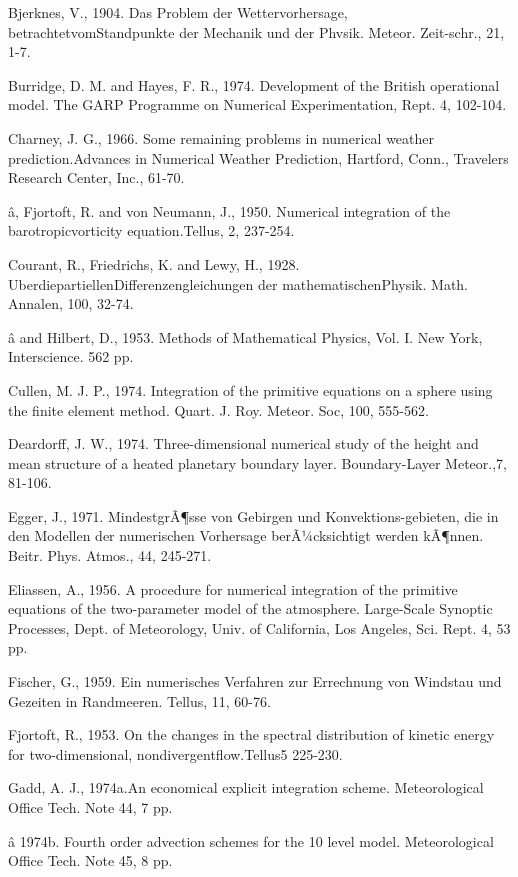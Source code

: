 Bjerknes, V., 1904. Das Problem der Wettervorhersage,
betrachtetvomStandpunkte der Mechanik und der Phvsik. Meteor.
Zeit-schr., 21, 1-7.

Burridge, D. M. and Hayes, F. R., 1974. Development of the British
operational model. The GARP Programme on Numerical Experimentation,
Rept. 4, 102-104.

Charney, J. G., 1966. Some remaining problems in numerical weather
prediction.Advances in Numerical Weather Prediction, Hartford, Conn.,
Travelers Research Center, Inc., 61-70.

â, Fjortoft, R. and von Neumann, J., 1950. Numerical integration of the
barotropicvorticity equation.Tellus, 2, 237-254.

Courant, R., Friedrichs, K. and Lewy, H., 1928.
UberdiepartiellenDifferenzengleichungen der mathematischenPhysik. Math.
Annalen, 100, 32-74.

â and Hilbert, D., 1953. Methods of Mathematical Physics, Vol. I. New
York, Interscience. 562 pp.

Cullen, M. J. P., 1974. Integration of the primitive equations on a
sphere using the finite element method. Quart. J. Roy. Meteor. Soc, 100,
555-562.

Deardorff, J. W., 1974. Three-dimensional numerical study of the height
and mean structure of a heated planetary boundary layer. Boundary-Layer
Meteor.,7, 81-106.

Egger, J., 1971. MindestgrÃ¶sse von Gebirgen und Konvektions-gebieten,
die in den Modellen der numerischen Vorhersage berÃ¼cksichtigt werden
kÃ¶nnen. Beitr. Phys. Atmos., 44, 245-271.

Eliassen, A., 1956. A procedure for numerical integration of the
primitive equations of the two-parameter model of the atmosphere.
Large-Scale Synoptic Processes, Dept. of Meteorology, Univ. of
California, Los Angeles, Sci. Rept. 4, 53 pp.

Fischer, G., 1959. Ein numerisches Verfahren zur Errechnung von Windstau
und Gezeiten in Randmeeren. Tellus, 11, 60-76.

Fjortoft, R., 1953. On the changes in the spectral distribution of
kinetic energy for two-dimensional, nondivergentflow.Tellus5 225-230.

Gadd, A. J., 1974a.An economical explicit integration scheme.
Meteorological Office Tech. Note 44, 7 pp.

â 1974b. Fourth order advection schemes for the 10 level model.
Meteorological Office Tech. Note 45, 8 pp.

